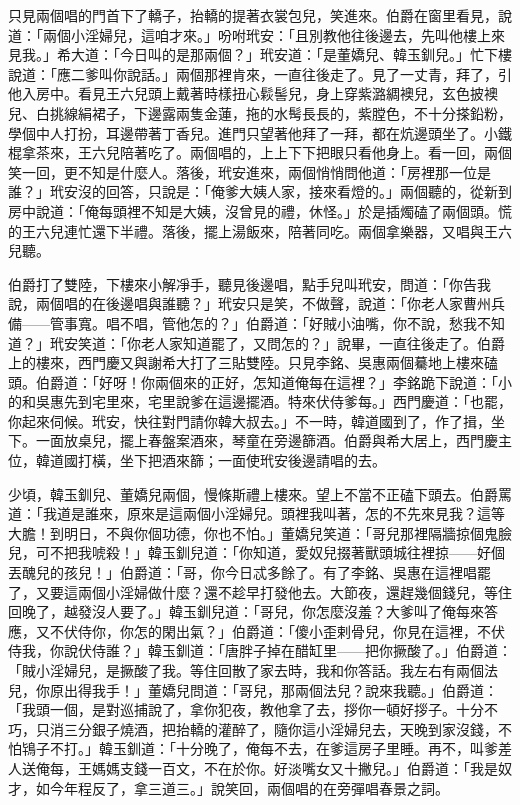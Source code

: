 只見兩個唱的門首下了轎子，抬轎的提著衣裳包兒，笑進來。伯爵在窗里看見，說道：「兩個小淫婦兒，這咱才來。」吩咐玳安：「且別教他往後邊去，先叫他樓上來見我。」希大道：「今日叫的是那兩個？」玳安道：「是董嬌兒、韓玉釧兒。」忙下樓說道：「應二爹叫你說話。」兩個那裡肯來，一直往後走了。見了一丈青，拜了，引他入房中。看見王六兒頭上戴著時樣扭心鬏髻兒，身上穿紫潞綢襖兒，玄色披襖兒、白挑線絹裙子，下邊露兩隻金蓮，拖的水髩長長的，紫膛色，不十分搽鉛粉，學個中人打扮，耳邊帶著丁香兒。進門只望著他拜了一拜，都在炕邊頭坐了。小鐵棍拿茶來，王六兒陪著吃了。兩個唱的，上上下下把眼只看他身上。看一回，兩個笑一回，更不知是什麼人。落後，玳安進來，兩個悄悄問他道：「房裡那一位是誰？」玳安沒的回答，只說是：「俺爹大姨人家，接來看燈的。」兩個聽的，從新到房中說道：「俺每頭裡不知是大姨，沒曾見的禮，休怪。」於是插燭磕了兩個頭。慌的王六兒連忙還下半禮。落後，擺上湯飯來，陪著同吃。兩個拿樂器，又唱與王六兒聽。

伯爵打了雙陸，下樓來小解凈手，聽見後邊唱，點手兒叫玳安，問道：「你告我說，兩個唱的在後邊唱與誰聽？」玳安只是笑，不做聲，說道：「你老人家曹州兵備——管事寬。唱不唱，管他怎的？」伯爵道：「好賊小油嘴，你不說，愁我不知道？」玳安笑道：「你老人家知道罷了，又問怎的？」說畢，一直往後走了。伯爵上的樓來，西門慶又與謝希大打了三貼雙陸。只見李銘、吳惠兩個驀地上樓來磕頭。伯爵道：「好呀！你兩個來的正好，怎知道俺每在這裡？」李銘跪下說道：「小的和吳惠先到宅里來，宅里說爹在這邊擺酒。特來伏侍爹每。」西門慶道：「也罷，你起來伺候。玳安，快往對門請你韓大叔去。」不一時，韓道國到了，作了揖，坐下。一面放桌兒，擺上春盤案酒來，琴童在旁邊篩酒。伯爵與希大居上，西門慶主位，韓道國打橫，坐下把酒來篩；一面使玳安後邊請唱的去。

少頃，韓玉釧兒、董嬌兒兩個，慢條斯禮上樓來。望上不當不正磕下頭去。伯爵罵道：「我道是誰來，原來是這兩個小淫婦兒。頭裡我叫著，怎的不先來見我？這等大膽！到明日，不與你個功德，你也不怕。」董嬌兒笑道：「哥兒那裡隔牆掠個鬼臉兒，可不把我唬殺！」韓玉釧兒道：「你知道，愛奴兒掇著獸頭城往裡掠——好個丟醜兒的孩兒！」伯爵道：「哥，你今日忒多餘了。有了李銘、吳惠在這裡唱罷了，又要這兩個小淫婦做什麼？還不趁早打發他去。大節夜，還趕幾個錢兒，等住回晚了，越發沒人要了。」韓玉釧兒道：「哥兒，你怎麼沒羞？大爹叫了俺每來答應，又不伏侍你，你怎的閑出氣？」伯爵道：「傻小歪剌骨兒，你見在這裡，不伏侍我，你說伏侍誰？」韓玉釧道：「唐胖子掉在醋缸里——把你撅酸了。」伯爵道：「賊小淫婦兒，是撅酸了我。等住回散了家去時，我和你答話。我左右有兩個法兒，你原出得我手！」董嬌兒問道：「哥兒，那兩個法兒？說來我聽。」伯爵道：「我頭一個，是對巡捕說了，拿你犯夜，教他拿了去，拶你一頓好拶子。十分不巧，只消三分銀子燒酒，把抬轎的灌醉了，隨你這小淫婦兒去，天晚到家沒錢，不怕鴇子不打。」韓玉釧道：「十分晚了，俺每不去，在爹這房子里睡。再不，叫爹差人送俺每，王媽媽支錢一百文，不在於你。好淡嘴女又十撇兒。」伯爵道：「我是奴才，如今年程反了，拿三道三。」說笑回，兩個唱的在旁彈唱春景之詞。

